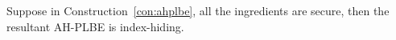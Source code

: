 \begin{theorem}\label{thm:index-hiding}
Suppose in Construction~\ref{con:ahplbe},
all the ingredients are secure,
then the resultant AH-PLBE is index-hiding.
\end{theorem}
